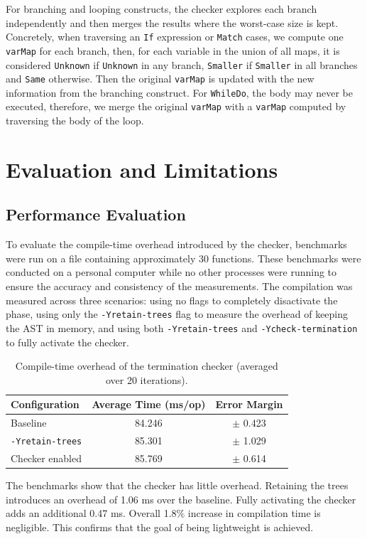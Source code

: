 For branching and looping constructs, the checker explores each branch
independently and then merges the results where the worst-case size is kept.
Concretely, when traversing an \texttt{If} expression or \texttt{Match} cases,
we compute one \texttt{varMap} for each branch, then, for each variable in the
union of all maps, it is considered \texttt{Unknown} if \texttt{Unknown} in
any branch, \texttt{Smaller} if \texttt{Smaller} in all branches and
\texttt{Same} otherwise. Then the original \texttt{varMap} is updated with the
new information from the branching construct.
For \texttt{WhileDo}, the body may never be executed, therefore, we merge
the original \texttt{varMap} with a \texttt{varMap} computed by traversing the
body of the loop.


\chapter{Evaluation and Limitations}

\section{Performance Evaluation}
To evaluate the compile-time overhead introduced by the checker, benchmarks were
run on a file containing approximately 30 functions. These benchmarks were
conducted on a personal computer while no other processes were running to ensure
the accuracy and consistency of the measurements.
The compilation was measured across three scenarios: using no flags to
completely disactivate the phase, using only the \texttt{-Yretain-trees} flag to
measure the overhead of keeping the AST in memory, and using both
\texttt{-Yretain-trees} and \texttt{-Ycheck-termination} to fully activate the
checker.
\begin{table}[h]
    \centering
    \begin{tabular}{lcc}
        \hline
        \textbf{Configuration} & \textbf{Average Time (ms/op)} &
                                                      \textbf{Error Margin} \\
        \hline
        Baseline                & 84.246 & $\pm$ 0.423 \\
        \texttt{-Yretain-trees} & 85.301 & $\pm$ 1.029 \\
        Checker enabled         & 85.769 & $\pm$ 0.614 \\
        \hline
    \end{tabular}
    \caption{
      Compile-time overhead of the termination checker (averaged over 20
      iterations).
    }
    \label{tab:bench}
\end{table}
The benchmarks show that the checker has little overhead. Retaining the trees
introduces an overhead of 1.06 ms over the baseline. Fully activating the
checker adds an additional 0.47 ms. Overall 1.8\% increase in compilation time
is negligible. This confirms that the goal of being lightweight is achieved.


